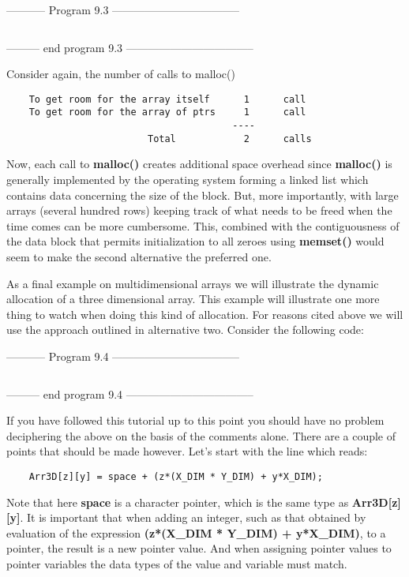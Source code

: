 -----------  Program 9.3  -----------------------------------
\inputminted[breaklines]{c}{../src/ch9-3.c}
--------- end program 9.3 -----------------------------------

Consider again, the number of calls to malloc()

\begin{verbatim}
    To get room for the array itself      1      call
    To get room for the array of ptrs     1      call
                                        ----
                         Total            2      calls
\end{verbatim}

Now, each call to \textbf{malloc()} creates additional space overhead
since \textbf{malloc()} is generally implemented by the operating system
forming a linked list which contains data concerning the size of the
block. But, more importantly, with large arrays (several hundred rows)
keeping track of what needs to be freed when the time comes can be more
cumbersome. This, combined with the contiguousness of the data block
that permits initialization to all zeroes using \textbf{memset()} would
seem to make the second alternative the preferred one.

As a final example on multidimensional arrays we will illustrate the
dynamic allocation of a three dimensional array. This example will
illustrate one more thing to watch when doing this kind of allocation.
For reasons cited above we will use the approach outlined in alternative
two. Consider the following code:

-----------  Program 9.4  -----------------------------------
\inputminted[breaklines]{c}{../src/ch9-4.c}
--------- end program 9.4 -----------------------------------

If you have followed this tutorial up to this point you should have no
problem deciphering the above on the basis of the comments alone. There
are a couple of points that should be made however. Let's start with the
line which reads:

\begin{verbatim}
    Arr3D[z][y] = space + (z*(X_DIM * Y_DIM) + y*X_DIM);
\end{verbatim}

Note that here \textbf{space} is a character pointer, which is the same
type as \textbf{Arr3D{[}z{]}{[}y{]}}. It is important that when adding
an integer, such as that obtained by evaluation of the expression
\textbf{(z*(X\_DIM * Y\_DIM) + y*X\_DIM)}, to a pointer, the result is a
new pointer value. And when assigning pointer values to pointer
variables the data types of the value and variable must match.

\begin{comment}
\href{ch10x.htm}{Chapter 10: Pointers to Functions}

\href{pointers.htm}{Back to Table of Contents}
\end{comment}
